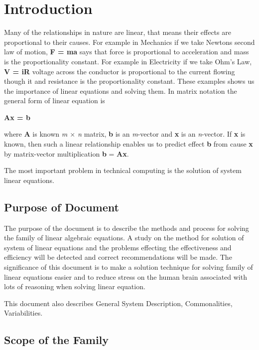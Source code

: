 \documentclass[12pt]{article}
\begin{document}
\newpage
{}

\section{Introduction}

Many of the relationships in nature are linear, that means their effects are
proportional to their causes. For example in Mechanics if we take Newtons second
law of motion, \textbf{F = ma} says that force is proportional to acceleration
and mass is the proportionality constant. For example in Electricity if we take
Ohm's Law, \textbf{V = iR} voltage across the conductor is proportional to the
current flowing though it and resistance is the proportionality constant. These
examples shows us the importance of linear equations and solving them. In matrix
notation the general form of linear equation is

 \centerline{\textbf{Ax = b}}

where \textbf{A} is known \textit{m $\times$ n} matrix, \textbf{b} is an
\textit{m}-vector and \textbf{x} is an \textit{n}-vector. If \textbf{x} is
known, then such a linear relationship enables us to predict effect \textbf{b}
from cause \textbf{x} by matrix-vector multiplication \textbf{b} =
\textbf{A}\textbf{x}.

The most important problem in technical computing is the solution of system
linear equations.



\subsection{Purpose of Document}

The purpose of the document is to describe the methods and process for solving
the family of linear algebraic equations. A study on the method for solution of
system of linear equations and the problems effecting the effectiveness and
efficiency will be detected and correct recommendations will be made. The
significance of this document is to make a solution technique for solving family
of linear equations easier and to reduce stress on the human brain associated
with lots of reasoning when solving linear equation.

This document also describes General System Description, Commonalities,
Variabilities.

\subsection{Scope of the Family} 
\end{document}
